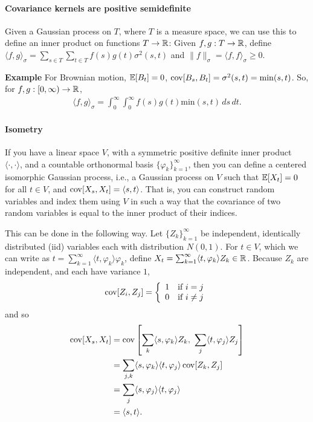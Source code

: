 \documentclass[../../../Master/AppliedStochastics.tex]{subfiles}
\begin{document}
\paragraph{Covariance kernels are positive semidefinite}
        Given a Gaussian process on $T$, where $T$ is a measure space, 
        we can use this to define an inner product on functions $T\to\mathbb{R}$:
        Given $f,g:T\to \mathbb{R}$, define $\langle f,g\rangle_{\sigma}=\sum_{s\in T}\sum_{t\in T}f(s)g(t)\sigma^2(s,t)$ 
        and $\|f\|_\sigma=\langle f,f\rangle_\sigma\geq 0$.

\textbf{Example} 
    For Brownian motion, $\mathbb{E}[B_t]=0$, $\operatorname{cov}[B_s,B_t]=\sigma^2(s,t)=\mathrm{min}(s,t)$.  
    So, for $f,g:[0,\infty)\to\mathbb{R}$, 
    $$\begin{aligned}
        \langle f,g\rangle_\sigma=\int_0^\infty\int_0^\infty f(s)g(t)\mathrm{min}(s,t)\,ds\,dt.
    \end{aligned}$$


\paragraph{Isometry} 
    If you have a linear space $V$, 
        with a symmetric positive definite inner product $\langle\cdot,\cdot \rangle$, 
        and a countable orthonormal basis $\{\varphi_k\}_{k=1}^{\infty}$, 
        then you can define a centered isomorphic Gaussian process, 
        i.e., a Gaussian process on $V$ such that $\mathbb{E}[X_t]=0$ for all $t\in V$, and $\operatorname{cov}[X_s,X_t]=\langle s,t\rangle$.  
        That is, you can construct random variables and index them using $V$ in such a way that the covariance of two random variables is equal to the inner product of their indices.

        This can be done in the following way.  
        Let $\{Z_k\}_{k=1}^\infty$ be independent, identically distributed (iid) variables each with distribution $N(0,1)$.  
        For $t\in V$, which we can write as $t=\sum_{k=1}^\infty \langle t,\varphi_k\rangle \varphi_k$, define $X_t=\sum_{k=1}^\infty \langle t,\varphi_k\rangle Z_k\in\mathbb{R}$.  
        Because $Z_k$ are independent, and each have variance $1$, 
        $$\begin{aligned}
            \operatorname{cov}[Z_i,Z_j]=\left\{\begin{array}{cc}
            1 & \text{if }i=j\\
            0 & \text{if }i\neq j\\
            \end{array}\right.
        \end{aligned}$$
        and so 
        $$\begin{aligned}
            \operatorname{cov}[X_s,X_t]
                &=\operatorname{cov}\left[\sum_k\langle s,\varphi_k\rangle Z_k,\,\,\sum_j\langle t,\varphi_j\rangle Z_j\right]\\
                &=\sum_{j,k}\langle s,\varphi_k\rangle \langle t,\varphi_j\rangle \operatorname{cov}[Z_k,Z_j]\\
                &=\sum_j\langle s,\varphi_j\rangle \langle t,\varphi_j\rangle\\
                &=\langle s,t\rangle.
        \end{aligned}$$
\end{document}
